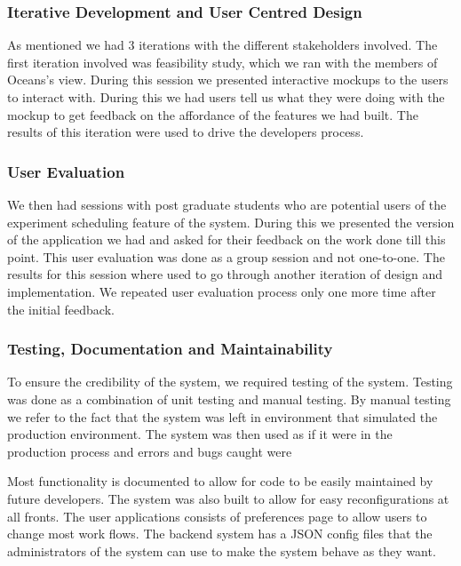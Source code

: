 \subsubsection{Iterative Development and User Centred Design}
As mentioned we had 3 iterations with the different stakeholders involved.
The first iteration involved was feasibility study, which we ran with the members of Oceans's view.
During this session we presented interactive mockups to the users to interact with.
During this we had users tell us what they were doing with the mockup to get feedback on the affordance of the features we had built.
The results of this iteration were used to drive the developers process.
\subsubsection{User Evaluation}
We then had sessions with post graduate students who are potential users of the experiment scheduling feature of the system.
During this we presented the version of the application we had and asked for their feedback on the work done till this point.
This user evaluation was done as a group session and not one-to-one.
The results for this session where used to go through another iteration of design and implementation.
We repeated user evaluation process only one more time after the initial feedback.
\subsubsection{Testing, Documentation and Maintainability}
To ensure the credibility of the system, we required testing of the system.
Testing was done as a combination of unit testing and manual testing.
By manual testing we refer to the fact that the system was left in environment that simulated the production environment.
The system was then used as if it were in the production process and errors and bugs caught were

Most functionality is documented to allow for code to be easily maintained by future developers.
The system was also built to allow for easy reconfigurations at all fronts.
The user applications consists of preferences page to allow users to change most work flows.
The backend system has a JSON config files that the administrators of the system can use to make the system behave as they want.

